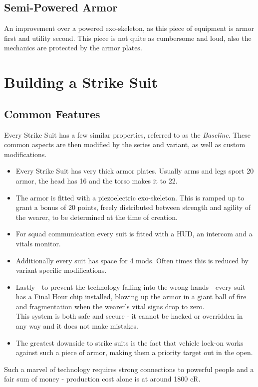 \documentclass[12pt,a4paper,openany]{book}
\begin{document}
	\section*{Semi-Powered Armor}
	An improvement over a powered exo-skeleton, as this piece of equipment is armor first and utility second. This piece is not quite as cumbersome and loud, also the mechanics are protected by the armor plates.
	\par
	
	\chapter{Building a Strike Suit}
	\section{Common Features}
	Every Strike Suit has a few similar properties, referred to as the \emph{Baseline}. These common aspects are then modified by the series and variant, as well as custom modifications.\par
	\begin{itemize}
		\item Every Strike Suit has very thick armor plates. Usually arms and legs sport 20 armor, the head has 16 and the torso makes it to 22.
		\item The armor is fitted with a piezoelectric exo-skeleton. This is ramped up to grant a bonus of 20 points, freely distributed between strength and agility of the wearer, to be determined at the time of creation.
		\item For squad communication every suit is fitted with a HUD, an intercom and a vitals monitor.
		\item Additionally every suit has space for 4 mods. Often times this is reduced by variant specific modifications.
		\item Lastly - to prevent the technology falling into the wrong hands - every suit has a Final Hour chip installed, blowing up the armor in a giant ball of fire and fragmentation when the wearer's vital signs drop to zero.\\
		This system is both safe and secure - it cannot be hacked or overridden in any way and it does not make mistakes.
		\item The greatest downside to strike suits is the fact that vehicle lock-on works against such a piece of armor, making them a priority target out in the open.
	\end{itemize}
	\par
	Such a marvel of technology requires strong connections to powerful people and a fair sum of money - production cost alone is at around 1800 cR.
\end{document}
